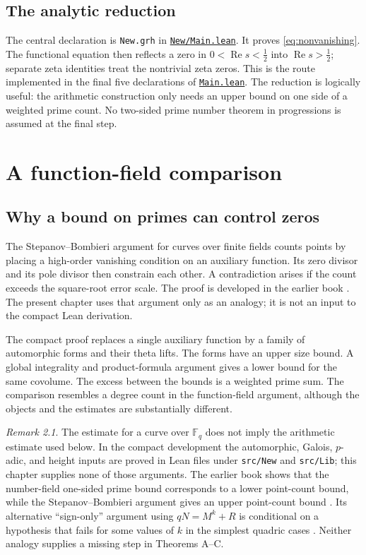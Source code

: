 \documentclass[11pt,oneside,openany]{amsbook}
\theoremstyle{remark}
\newtheorem{remark}[theorem]{Remark}
\numberwithin{equation}{section}
\newcommand{\re}{\operatorname{Re}}
\newcommand{\ghroot}{https://github.com/lsernau/grh-lean/blob/}
\newcommand{\ghrev}{72fead102f663d5c7a407964a13dc0cf9d977207}
\newcommand{\leanfile}[2]{%
  \href{\ghroot\ghrev/grh-compact/src/#1}{\nolinkurl{#2}}}
\begin{document}
\section{The analytic reduction}
\label{sec:analytic-reduction}
The central declaration is \texttt{New.grh} in
\leanfile{New/Main.lean}{New/Main.lean}. It proves
\eqref{eq:nonvanishing}. The functional equation then reflects a
zero in $0<\re s<\tfrac12$ into $\re s>\tfrac12$; separate
zeta identities treat the nontrivial zeta zeros. This is the route
implemented in the final five declarations of
\leanfile{Main.lean}{Main.lean}. The reduction is logically useful:
the arithmetic construction only needs an upper bound on one side
of a weighted prime count. No two-sided prime number theorem in
progressions is assumed at the final step.

\chapter{A function-field comparison}
\label{ch:model}
\section{Why a bound on primes can control zeros}
The Stepanov--Bombieri argument for curves over finite fields counts
points by placing a high-order vanishing condition on an auxiliary
function. Its zero divisor and its pole divisor then constrain each
other. A contradiction arises if the count exceeds the square-root
error scale. The proof is developed in the earlier book
\cite[Ch.~2]{Dupuy2026}. The present chapter uses that argument only
as an analogy; it is not an input to the compact Lean derivation.

The compact proof replaces a single auxiliary function by a family
of automorphic forms and their theta lifts. The forms have an upper
size bound. A global integrality and product-formula argument gives
a lower bound for the same covolume. The excess between the bounds
is a weighted prime sum. The comparison resembles a degree count
in the function-field argument, although the objects and the
estimates are substantially different.

\begin{remark}
\label{rem:analogy-limit}
The estimate for a curve over $\mathbb F_q$ does not imply the
arithmetic estimate used below. In the compact development the
automorphic, Galois, $p$-adic, and height inputs are proved in Lean
files under \texttt{src/New} and \texttt{src/Lib}; this chapter
supplies none of those arguments.
The earlier book shows that the number-field one-sided prime
bound corresponds to a lower point-count bound, while the
Stepanov--Bombieri argument gives an upper point-count bound
\cite[Ch.~2, direction of the bound]{Dupuy2026}.
Its alternative ``sign-only'' argument using $qN=M^k+R$
is conditional on a hypothesis that fails for some values of
$k$ in the simplest quadric cases
\cite[Ch.~2, second hypothesis]{Dupuy2026}.
Neither analogy supplies a missing step in Theorems A--C.
\end{remark}
\end{document}
